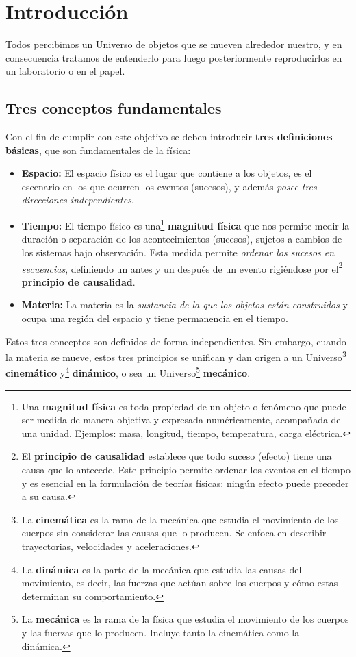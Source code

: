 \documentclass[../apunte_mecanica_clasica.tex]{subfiles}%
\begin{document}
\chapter{Introducción}

Todos percibimos un Universo de objetos que se mueven alrededor nuestro, y en consecuencia tratamos de entenderlo para luego posteriormente reproducirlos en un laboratorio o en el papel.

\section{Tres conceptos fundamentales}

Con el fin de cumplir con este objetivo se deben introducir \textbf{tres definiciones básicas}, que son fundamentales de la física:

\begin{itemize}
    \item \textbf{Espacio:} El espacio físico es el lugar que contiene a los objetos, es el escenario en los que ocurren los eventos (sucesos), y además \textit{posee tres direcciones independientes}.
    
    \item \textbf{Tiempo:}  El tiempo físico es una\footnote{Una \textbf{magnitud física} es toda propiedad de un objeto o fenómeno que puede ser medida de manera objetiva y expresada numéricamente, acompañada de una unidad. Ejemplos: masa, longitud, tiempo, temperatura, carga eléctrica.} \textbf{magnitud física} que nos permite medir la duración o separación de los acontecimientos (sucesos), sujetos a cambios de los sistemas bajo observación. Esta medida permite \textit{ordenar los sucesos en secuencias}, definiendo un antes y un después de un evento rigiéndose por el\footnote{El \textbf{principio de causalidad} establece que todo suceso (efecto) tiene una causa que lo antecede. Este principio permite ordenar los eventos en el tiempo y es esencial en la formulación de teorías físicas: ningún efecto puede preceder a su causa.} \textbf{principio de causalidad}.
    
    \item \textbf{Materia:} La materia es la \textit{sustancia de la que los objetos están construidos} y ocupa una región del espacio y tiene permanencia en el tiempo.
\end{itemize}

Estos tres conceptos son definidos de forma independientes. Sin embargo, cuando la materia se mueve, estos tres principios se unifican y dan origen a un Universo\footnote{La \textbf{cinemática} es la rama de la mecánica que estudia el movimiento de los cuerpos sin considerar las causas que lo producen. Se enfoca en describir trayectorias, velocidades y aceleraciones.} \textbf{cinemático} y\footnote{La \textbf{dinámica} es la parte de la mecánica que estudia las causas del movimiento, es decir, las fuerzas que actúan sobre los cuerpos y cómo estas determinan su comportamiento.} \textbf{dinámico}, o sea un Universo\footnote{La \textbf{mecánica} es la rama de la física que estudia el movimiento de los cuerpos y las fuerzas que lo producen. Incluye tanto la cinemática como la dinámica.} \textbf{mecánico}.
\end{document}
